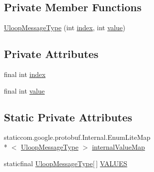 \subsection*{Private Member Functions}
\begin{DoxyCompactItemize}
\item 
\hyperlink{enumeu_1_1uloop_1_1messages_1_1UloopMessages_1_1UloopMessageType_a47bcc9408a8b6ebadc16ecf51e38ab5a}{Uloop\+Message\+Type} (int \hyperlink{enumeu_1_1uloop_1_1messages_1_1UloopMessages_1_1UloopMessageType_aec1ce079512854d8a1e703fe37dcfd29}{index}, int \hyperlink{enumeu_1_1uloop_1_1messages_1_1UloopMessages_1_1UloopMessageType_a757996108c5d548bcfaf69a86a385761}{value})
\end{DoxyCompactItemize}
\subsection*{Private Attributes}
\begin{DoxyCompactItemize}
\item 
final int \hyperlink{enumeu_1_1uloop_1_1messages_1_1UloopMessages_1_1UloopMessageType_aec1ce079512854d8a1e703fe37dcfd29}{index}
\item 
final int \hyperlink{enumeu_1_1uloop_1_1messages_1_1UloopMessages_1_1UloopMessageType_a757996108c5d548bcfaf69a86a385761}{value}
\end{DoxyCompactItemize}
\subsection*{Static Private Attributes}
\begin{DoxyCompactItemize}
\item 
staticcom.\+google.\+protobuf.\+Internal.\+Enum\+Lite\+Map\\*
$<$ \hyperlink{enumeu_1_1uloop_1_1messages_1_1UloopMessages_1_1UloopMessageType}{Uloop\+Message\+Type} $>$ \hyperlink{enumeu_1_1uloop_1_1messages_1_1UloopMessages_1_1UloopMessageType_afb6e1f733b8bcb79ab024acc56156437}{internal\+Value\+Map}
\item 
staticfinal \hyperlink{enumeu_1_1uloop_1_1messages_1_1UloopMessages_1_1UloopMessageType}{Uloop\+Message\+Type}\mbox{[}$\,$\mbox{]} \hyperlink{enumeu_1_1uloop_1_1messages_1_1UloopMessages_1_1UloopMessageType_acba7a3d491de5b16d9963b763ed919ee}{V\+A\+L\+U\+E\+S}
\end{DoxyCompactItemize}



